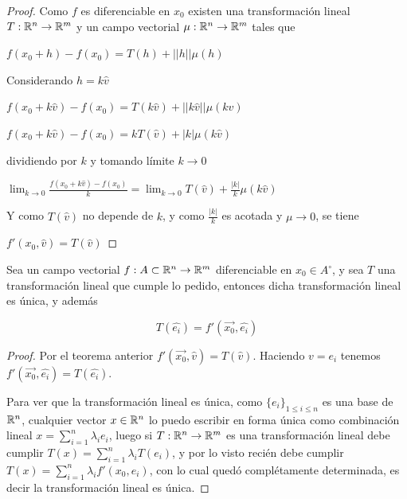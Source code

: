 \begin{proof}
Como $f$ es diferenciable en $x_0$ existen una transformación lineal $T : \mathbb{R}^n \to \mathbb{R}^m$ y un campo vectorial $ \mu : \mathbb{R}^n \to \mathbb{R}^m$ tales que

$ \displaystyle f(x_0 + h) - f(x_0) = T(h) + ||h|| \mu(h)$

Considerando $ h = k\hat{v}$

$ \displaystyle f(x_0 + k\hat{v}) - f(x_0) = T(k\hat{v}) + ||k \hat{v}|| \mu(k\hat{v})$

$ \displaystyle f(x_0 + k\hat{v}) - f(x_0) = k T(\hat{v}) + |k| \mu(k\hat{v})$

dividiendo por $k$ y tomando límite $ k \to 0 $

$ \displaystyle \lim_{k \to 0} \frac{f(x_0 + k\hat{v}) - f(x_0)}{k} = \lim_{k \to 0} T(\hat{v}) + \frac{|k|}{k} \mu(k \hat{v})$

Y como $T(\hat{v})$ no depende de $k$, y como $\frac{|k|}{k}$ es acotada y $\mu \to 0$, se tiene

$ \displaystyle f'(x_0, \hat{v}) = T(\hat{v}) $
\end{proof}

\begin{corollary}
Sea un campo vectorial $ f : A \subset \mathbb{R}^n \to \mathbb{R}^m$ diferenciable en $x_0 \in A^{\circ}$, y sea $T$ una transformación lineal que cumple lo pedido, entonces dicha transformación lineal es única, y además 

$$ T(\hat{e_i}) = f'(\vec{x_0}, \hat{e_i})$$  
\end{corollary}

\begin{proof}
Por el teorema anterior $ f'(\vec{x_0}, \hat{v}) = T(\hat{v}) $.  Haciendo $ v = e_i$ tenemos $ f'(\vec{x_0}, \hat{e_i}) = T(\hat{e_i}) $.  

Para ver que la transformación lineal es única, como $\{e_i\}_{1 \leq i \leq n}$ es una base de $\mathbb{R}^n$, cualquier vector $x \in \mathbb{R}^n$ lo puedo escribir en forma única como combinación lineal $x = \sum_{i=1}^n \lambda_i e_i$, luego si $T : \mathbb{R}^n \to \mathbb{R}^m$ es una transformación lineal debe cumplir $T(x) = \sum_{i=1}^n \lambda_i T(e_i)$, y por lo visto recién debe cumplir  $T(x) = \sum_{i=1}^n \lambda_i f'(x_0, e_i)$, con lo cual quedó complétamente determinada, es decir la transformación lineal es única.
\end{proof}


